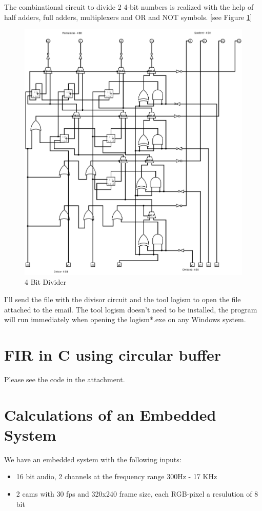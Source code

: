 \documentclass[a4paper,10pt]{scrartcl}
\begin{document}
The combinational circuit to divide 2 4-bit numbers is realized with the help of half adders, full adders, multiplexers and OR and NOT symbols. [see Figure \ref{fig:divider}]
\begin{figure}[h!]
\centering
\includegraphics[width=\textwidth]{4BitDivider.png}
\caption{4 Bit Divider}
\label{fig:divider}
\end{figure}

I'll send the file with the divisor circuit and the tool logism to open the file attached to the email. The tool logism doesn't need to be installed, the program will run immediately when opening the logism*.exe on any Windows system.

\newpage
\section{FIR in C using circular buffer}
Please see the code in the attachment.
\section{Calculations of an Embedded System}
We have an embedded system with the following inputs:
\begin{itemize}
\item 16 bit audio, 2 channels at the frequency range 300Hz - 17 KHz
\item 2 cams with 30 fps and 320x240 frame size, each RGB-pixel a resulution of 8 bit
\end{itemize}
\end{document}
